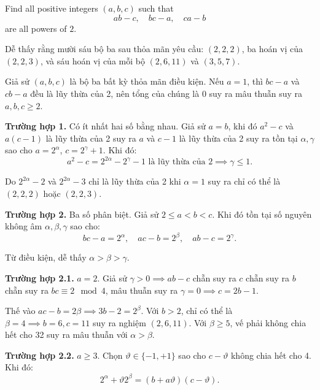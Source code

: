 \ifshowproblemandsoln
\ifshowproblem\begin{problem}\label{problem:IMO-2015-P2}\fi
\ifshowsoln\begin{problem}\fi
    Find all positive integers $(a,b,c)$ such that
    $$ab-c,\quad bc-a,\quad ca-b$$are all powers of $2$.
\end{problem}
\fi

\ifshowsoln
\begin{soln}\footnotemark
    Dễ thấy rằng mười sáu bộ ba sau thỏa mãn yêu cầu: \( (2, 2, 2) \), ba hoán vị của \( (2, 2, 3) \), và sáu hoán vị của mỗi bộ \( (2, 6, 11) \) và \( (3, 5, 7) \).

    Giả sử \( (a, b, c) \) là bộ ba bất kỳ thỏa mãn điều kiện. Nếu \( a = 1 \), thì \( bc - a \) và \( cb - a \) đều là lũy thừa của 2,
    nên tổng của chúng là 0 suy ra mâu thuẫn suy ra \( a, b, c \ge 2 \).

    \textbf{Trường hợp 1.} Có ít nhất hai số bằng nhau. Giả sử \( a = b \), khi đó \( a^2 - c \) và \( a(c - 1) \) là lũy thừa của 2
    suy ra \( a \) và \( c - 1 \) là lũy thừa của 2 suy ra tồn tại \( \alpha, \gamma \) sao cho \( a = 2^\alpha \), \( c = 2^\gamma + 1 \). Khi đó:
    \[
        a^2 - c = 2^{2\alpha} - 2^\gamma - 1 \text{ là lũy thừa của 2} \implies \gamma \le 1.
    \]

    Do \( 2^{2\alpha} - 2 \) và \( 2^{2\alpha} - 3 \) chỉ là lũy thừa của 2 khi \( \alpha = 1 \) suy ra chỉ có thể là \( (2, 2, 2) \) hoặc \( (2, 2, 3) \).

    \textbf{Trường hợp 2.} Ba số phân biệt. Giả sử \( 2 \le a < b < c \). Khi đó tồn tại số nguyên không âm \( \alpha, \beta, \gamma \) sao cho:
    \[
        bc - a = 2^\alpha, \quad ac - b = 2^\beta, \quad ab - c = 2^\gamma.
    \]

    Từ điều kiện, dễ thấy \( \alpha > \beta > \gamma \).

    \textbf{Trường hợp 2.1.} \( a = 2 \). Giả sử \( \gamma > 0 \implies ab - c \) chẵn suy ra \( c \) chẵn
    suy ra \( b \) chẵn suy ra \( bc \equiv 2 \mod 4 \), mâu thuẫn suy ra \( \gamma = 0 \implies c = 2b - 1 \).

    Thế vào \( ac - b = 2\beta \implies 3b - 2 = 2^\beta \). Với \( b > 2 \), chỉ có thể là \( \beta = 4 \implies b = 6, c = 11 \)
    suy ra nghiệm \( (2, 6, 11) \). Với \( \beta \ge 5 \), vế phải không chia hết cho 32 suy ra mâu thuẫn với \( \alpha > \beta \).

    \textbf{Trường hợp 2.2.} \( a \ge 3 \). Chọn \( \vartheta \in \{-1, +1\} \) sao cho \( c - \vartheta \) không chia hết cho 4. Khi đó:
    \[
        2^\alpha + \vartheta 2^\beta = (b + a\vartheta)(c - \vartheta).
    \]
    

\end{soln}
\end{problem}
